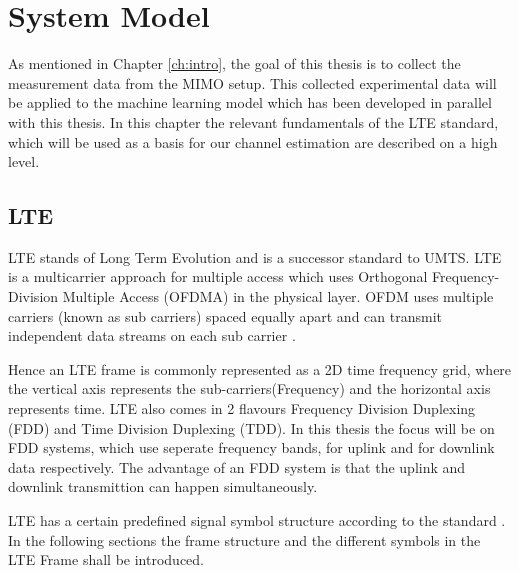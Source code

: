 \chapter{System Model}
\label{ch:sysmodel}

As mentioned in Chapter \ref{ch:intro}, the goal of this thesis is to collect the measurement data from the MIMO setup. This collected experimental data will be applied to the machine learning model which has been developed in parallel with this thesis. In this chapter the relevant fundamentals of the LTE standard, which will be used as a basis for our channel estimation are described on a high level.

%

\section{LTE}\label{sec:LTEProc}

LTE stands of Long Term Evolution and is a successor standard to UMTS. LTE is a multicarrier approach for multiple access which uses Orthogonal Frequency-Division Multiple Access (OFDMA) in the physical layer. OFDM uses multiple carriers (known as sub carriers) spaced equally apart and can transmit independent data streams on each sub carrier \cite{rohling}.

\par

Hence an LTE frame is commonly represented as a 2D time frequency grid, where the vertical axis represents the sub-carriers(Frequency) and the horizontal axis represents time. LTE also comes in 2 flavours Frequency Division Duplexing (FDD) and Time Division Duplexing (TDD). In this thesis the focus will be on FDD systems, which use seperate frequency bands, for uplink and for downlink data respectively. The advantage of an FDD system is that the uplink and downlink transmittion can happen simultaneously.

LTE has a certain predefined signal symbol structure according to the standard \cite{3gpp36211}. In the following sections the frame structure and the different symbols in the LTE Frame shall be introduced.

